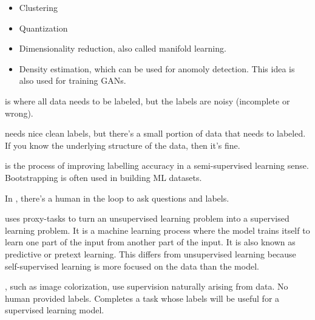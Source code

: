 \documentclass[12pt]{scrartcl}
\begin{document}
\begin{itemize}
  \item Clustering
  \item Quantization
  \item Dimensionality reduction, also called manifold learning. 
  \item Density estimation, which can be used for anomoly detection. This idea is also used
  for training GANs.
\end{itemize}

\begin{definition}
   is where all data needs to be labeled, but the labels
  are noisy (incomplete or wrong). 
\end{definition}

\begin{definition}
   needs nice clean labels, but there's a small
  portion of data that needs to labeled. If you know the underlying structure of the data,
  then it's fine. 
\end{definition}

\begin{definition}
   is the process of improving labelling accuracy in a semi-supervised learning sense. 
  Bootstrapping is often used in building ML datasets.
\end{definition}

\begin{definition}
  In , there's a human in the loop to ask questions and labels. 
\end{definition}

\begin{definition}
   uses proxy-tasks to turn
  an unsupervised learning problem into a supervised learning problem. It is 
  a machine learning process where the model trains itself to learn one part of the input 
  from another part of the input. It is also known as predictive or pretext learning. 
  This differs from unsupervised learning because self-supervised learning is more 
  focused on the data than the model. 
\end{definition}

\begin{definition}
  , such as image colorization, use supervision naturally arising from data.
  No human provided labels. Completes a task whose labels will be useful for a supervised learning model. 
\end{definition}
\end{document}
